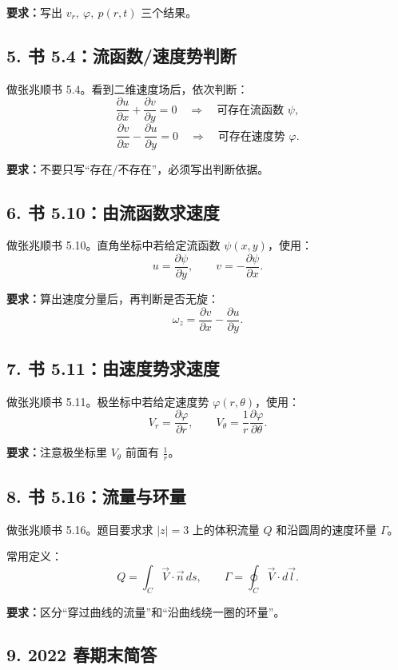 ﻿\documentclass[UTF8,zihao=-4]{ctexart}
\newcommand{\task}[1]{\textbf{#1}}
\begin{document}
\task{要求：}写出 $v_r,\ \varphi,\ p(r,t)$ 三个结果。

\subsection*{5. 书 5.4：流函数/速度势判断}

做张兆顺书 5.4。看到二维速度场后，依次判断：
\[
\frac{\partial u}{\partial x}+\frac{\partial v}{\partial y}=0
\quad \Longrightarrow \quad
\text{可存在流函数 } \psi ,
\]
\[
\frac{\partial v}{\partial x}-\frac{\partial u}{\partial y}=0
\quad \Longrightarrow \quad
\text{可存在速度势 } \varphi .
\]

\task{要求：}不要只写“存在/不存在”，必须写出判断依据。

\subsection*{6. 书 5.10：由流函数求速度}

做张兆顺书 5.10。直角坐标中若给定流函数 $\psi(x,y)$，使用：
\[
u=\frac{\partial \psi}{\partial y},
\qquad
v=-\frac{\partial \psi}{\partial x}.
\]

\task{要求：}算出速度分量后，再判断是否无旋：
\[
\omega_z=\frac{\partial v}{\partial x}-\frac{\partial u}{\partial y}.
\]

\subsection*{7. 书 5.11：由速度势求速度}

做张兆顺书 5.11。极坐标中若给定速度势 $\varphi(r,\theta)$，使用：
\[
V_r=\frac{\partial\varphi}{\partial r},
\qquad
V_\theta=\frac{1}{r}\frac{\partial\varphi}{\partial\theta}.
\]

\task{要求：}注意极坐标里 $V_\theta$ 前面有 $\frac{1}{r}$。

\subsection*{8. 书 5.16：流量与环量}

做张兆顺书 5.16。题目要求求 $|z|=3$ 上的体积流量 $Q$ 和沿圆周的速度环量 $\Gamma$。

常用定义：
\[
Q=\int_C \vec V\cdot \vec n\,ds,
\qquad
\Gamma=\oint_C \vec V\cdot d\vec l.
\]

\task{要求：}区分“穿过曲线的流量”和“沿曲线绕一圈的环量”。

\subsection*{9. 2022 春期末简答}
\end{document}
